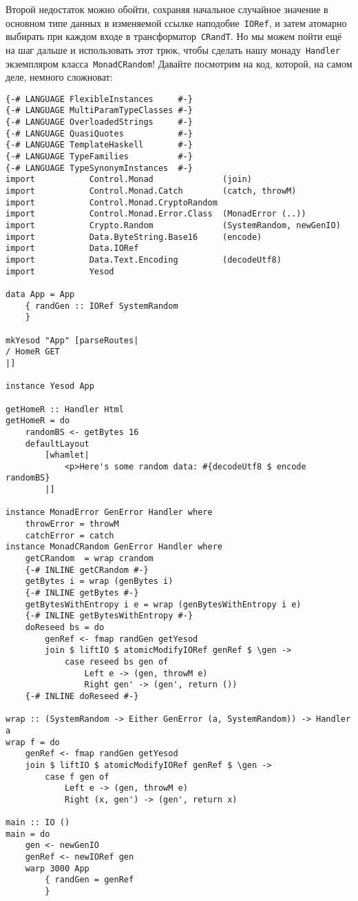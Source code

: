 Второй недостаток можно обойти, сохраняя начальное случайное значение в
основном типе данных в изменяемой ссылке наподобие~\lstinline'IORef', и затем
атомарно выбирать при каждом входе в трансформатор~\lstinline'CRandT'. Но мы
можем пойти ещё на шаг дальше и использовать этот трюк, чтобы сделать нашу
монаду~\lstinline'Handler' экземпляром класса~\lstinline'MonadCRandom'!
Давайте посмотрим на код, которой, на самом деле, немного сложноват:
\begin{lstlisting}
{-# LANGUAGE FlexibleInstances     #-}
{-# LANGUAGE MultiParamTypeClasses #-}
{-# LANGUAGE OverloadedStrings     #-}
{-# LANGUAGE QuasiQuotes           #-}
{-# LANGUAGE TemplateHaskell       #-}
{-# LANGUAGE TypeFamilies          #-}
{-# LANGUAGE TypeSynonymInstances  #-}
import           Control.Monad              (join)
import           Control.Monad.Catch        (catch, throwM)
import           Control.Monad.CryptoRandom
import           Control.Monad.Error.Class  (MonadError (..))
import           Crypto.Random              (SystemRandom, newGenIO)
import           Data.ByteString.Base16     (encode)
import           Data.IORef
import           Data.Text.Encoding         (decodeUtf8)
import           Yesod

data App = App
    { randGen :: IORef SystemRandom
    }

mkYesod "App" [parseRoutes|
/ HomeR GET
|]

instance Yesod App

getHomeR :: Handler Html
getHomeR = do
    randomBS <- getBytes 16
    defaultLayout
        [whamlet|
            <p>Here's some random data: #{decodeUtf8 $ encode randomBS}
        |]

instance MonadError GenError Handler where
    throwError = throwM
    catchError = catch
instance MonadCRandom GenError Handler where
    getCRandom  = wrap crandom
    {-# INLINE getCRandom #-}
    getBytes i = wrap (genBytes i)
    {-# INLINE getBytes #-}
    getBytesWithEntropy i e = wrap (genBytesWithEntropy i e)
    {-# INLINE getBytesWithEntropy #-}
    doReseed bs = do
        genRef <- fmap randGen getYesod
        join $ liftIO $ atomicModifyIORef genRef $ \gen ->
            case reseed bs gen of
                Left e -> (gen, throwM e)
                Right gen' -> (gen', return ())
    {-# INLINE doReseed #-}

wrap :: (SystemRandom -> Either GenError (a, SystemRandom)) -> Handler a
wrap f = do
    genRef <- fmap randGen getYesod
    join $ liftIO $ atomicModifyIORef genRef $ \gen ->
        case f gen of
            Left e -> (gen, throwM e)
            Right (x, gen') -> (gen', return x)

main :: IO ()
main = do
    gen <- newGenIO
    genRef <- newIORef gen
    warp 3000 App
        { randGen = genRef
        }
\end{lstlisting}

